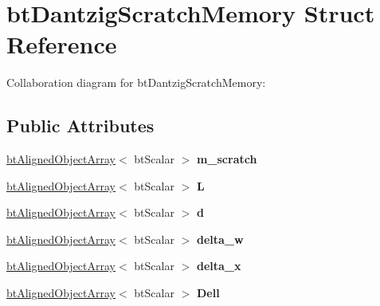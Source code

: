 \hypertarget{structbt_dantzig_scratch_memory}{\section{bt\+Dantzig\+Scratch\+Memory Struct Reference}
\label{structbt_dantzig_scratch_memory}
}


Collaboration diagram for bt\+Dantzig\+Scratch\+Memory\+:
\subsection*{Public Attributes}
\begin{DoxyCompactItemize}
\item 
\hypertarget{structbt_dantzig_scratch_memory_aaa6478f084f57ac97b8ff025cf58af23}{\hyperlink{classbt_aligned_object_array}{bt\+Aligned\+Object\+Array}$<$ bt\+Scalar $>$ {\bfseries m\+\_\+scratch}}\label{structbt_dantzig_scratch_memory_aaa6478f084f57ac97b8ff025cf58af23}

\item 
\hypertarget{structbt_dantzig_scratch_memory_a74bb1dac417d62d8b2543e30c92acba0}{\hyperlink{classbt_aligned_object_array}{bt\+Aligned\+Object\+Array}$<$ bt\+Scalar $>$ {\bfseries L}}\label{structbt_dantzig_scratch_memory_a74bb1dac417d62d8b2543e30c92acba0}

\item 
\hypertarget{structbt_dantzig_scratch_memory_a7146f0f3b14b713fb1b53b522ce2d503}{\hyperlink{classbt_aligned_object_array}{bt\+Aligned\+Object\+Array}$<$ bt\+Scalar $>$ {\bfseries d}}\label{structbt_dantzig_scratch_memory_a7146f0f3b14b713fb1b53b522ce2d503}

\item 
\hypertarget{structbt_dantzig_scratch_memory_a1b5dea782943c0f28846a76fd585ccb1}{\hyperlink{classbt_aligned_object_array}{bt\+Aligned\+Object\+Array}$<$ bt\+Scalar $>$ {\bfseries delta\+\_\+w}}\label{structbt_dantzig_scratch_memory_a1b5dea782943c0f28846a76fd585ccb1}

\item 
\hypertarget{structbt_dantzig_scratch_memory_a21e95a21f726f4d7585e5f360d983f4b}{\hyperlink{classbt_aligned_object_array}{bt\+Aligned\+Object\+Array}$<$ bt\+Scalar $>$ {\bfseries delta\+\_\+x}}\label{structbt_dantzig_scratch_memory_a21e95a21f726f4d7585e5f360d983f4b}

\item 
\hypertarget{structbt_dantzig_scratch_memory_a5edc78e724e08192c2d1309abd6a49e6}{\hyperlink{classbt_aligned_object_array}{bt\+Aligned\+Object\+Array}$<$ bt\+Scalar $>$ {\bfseries Dell}}\label{structbt_dantzig_scratch_memory_a5edc78e724e08192c2d1309abd6a49e6}


\end{DoxyCompactItemize}
